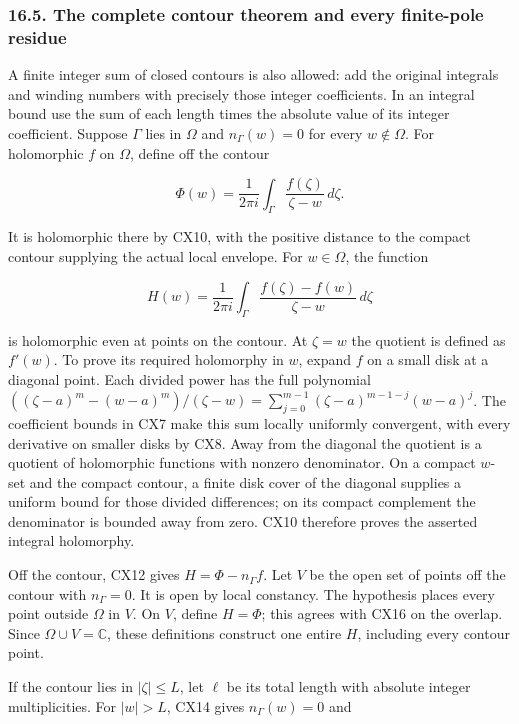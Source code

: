 \documentclass[
  11pt,
]{article}
\begin{document}
\subsubsection{16.5. The complete contour theorem and every finite-pole
residue}\label{the-complete-contour-theorem-and-every-finite-pole-residue}

A finite integer sum of closed contours is also allowed: add the
original integrals and winding numbers with precisely those integer
coefficients. In an integral bound use the sum of each length times the
absolute value of its integer coefficient. Suppose \(\Gamma\) lies in
\(\Omega\) and \(n_\Gamma(w)=0\) for every \(w\notin\Omega\). For
holomorphic \(f\) on \(\Omega\), define off the contour

\[
\Phi(w)=\frac1{2\pi i}\int_\Gamma\frac{f(\zeta)}{\zeta-w}\,d\zeta .
\tag{CX15}
\]

It is holomorphic there by CX10, with the positive distance to the
compact contour supplying the actual local envelope. For \(w\in\Omega\),
the function

\[
H(w)=\frac1{2\pi i}\int_\Gamma
             \frac{f(\zeta)-f(w)}{\zeta-w}\,d\zeta
\tag{CX16}
\]

is holomorphic even at points on the contour. At \(\zeta=w\) the
quotient is defined as \(f'(w)\). To prove its required holomorphy in
\(w\), expand \(f\) on a small disk at a diagonal point. Each divided
power has the full polynomial \(((\zeta-a)^m-(w-a)^m)/(\zeta-w)
=\sum_{j=0}^{m-1}(\zeta-a)^{m-1-j}(w-a)^j\). The coefficient bounds in
CX7 make this sum locally uniformly convergent, with every derivative on
smaller disks by CX8. Away from the diagonal the quotient is a quotient
of holomorphic functions with nonzero denominator. On a compact
\(w\)-set and the compact contour, a finite disk cover of the diagonal
supplies a uniform bound for those divided differences; on its compact
complement the denominator is bounded away from zero. CX10 therefore
proves the asserted integral holomorphy.

Off the contour, CX12 gives \(H=\Phi-n_\Gamma f\). Let \(V\) be the open
set of points off the contour with \(n_\Gamma=0\). It is open by local
constancy. The hypothesis places every point outside \(\Omega\) in
\(V\). On \(V\), define \(H=\Phi\); this agrees with CX16 on the
overlap. Since \(\Omega\cup V=\mathbb C\), these definitions construct
one entire \(H\), including every contour point.

If the contour lies in \(|\zeta|\leq L\), let \(\ell\) be its total
length with absolute integer multiplicities. For \(|w|>L\), CX14 gives
\(n_\Gamma(w)=0\) and
\end{document}
